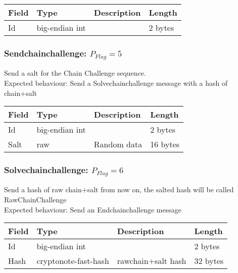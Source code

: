 \documentclass[a4paper,10pt]{article}
\begin{document}
                \noindent\begin{tabularx}{\textwidth}{|l|l|X|l|}
                    \hline Field & Type & Description & Length \\ \hline
                    \hline Id & big-endian int & & 2 bytes \\
                    \hline
                \end{tabularx}

            \subsubsection{Sendchainchallenge: $P_{Flag} = 5$}
                Send a salt for the Chain Challenge sequence.\\
                Expected behaviour: Send a Solvechainchallenge message with a hash of chain+salt\\
                
                \noindent\begin{tabularx}{\textwidth}{|l|l|X|l|}
                    \hline Field & Type & Description & Length \\ \hline
                    \hline Id & big-endian int & & 2 bytes \\
                    \hline Salt & raw & Random data & 16 bytes \\
                    \hline
                \end{tabularx}
            
            \subsubsection{Solvechainchallenge: $P_{Flag} = 6$}
                Send a hash of raw chain+salt from now on, the salted hash will be called RawChainChallenge\\
                Expected behaviour: Send an Endchainchallenge message\\
                
                \noindent\begin{tabularx}{\textwidth}{|l|l|X|l|}
                    \hline Field & Type & Description & Length \\ \hline
                    \hline Id & big-endian int & & 2 bytes \\
                    \hline Hash & cryptonote-fast-hash & rawchain+salt hash & 32 bytes \\
                    \hline
                \end{tabularx}
            
\end{document}
